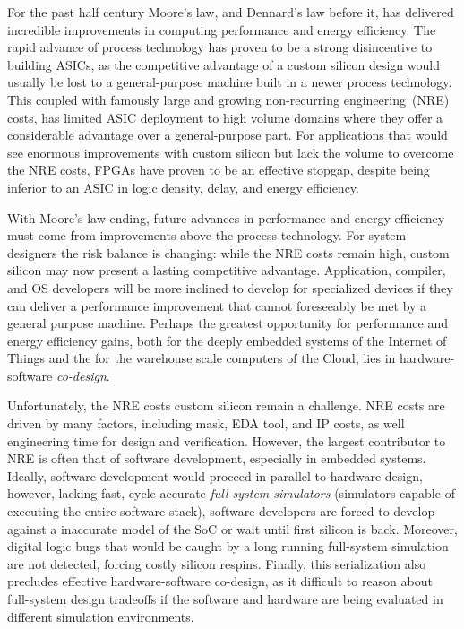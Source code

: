 For the past half century Moore's law, and Dennard's law before it, has
delivered incredible improvements in computing performance and energy
efficiency. The rapid advance of process technology has proven to be a strong
disincentive to building ASICs, as the competitive advantage of a custom
silicon design would usually be lost to a general-purpose machine built in a
newer process technology. This coupled with famously large and growing non-recurring
engineering~(NRE) costs, has limited ASIC deployment to high volume domains
where they offer a considerable advantage over a general-purpose part. For
applications that would see enormous improvements with custom silicon but lack
the volume to overcome the NRE costs, FPGAs have proven to be an effective
stopgap, despite being inferior to an ASIC in logic density, delay, and energy
efficiency.

With Moore’s law ending, future advances in performance and energy-efficiency
must come from improvements above the process technology. For system designers
the risk balance is changing: while the NRE costs remain high, custom silicon
may now present a lasting competitive advantage. Application, compiler, and OS
developers will be more inclined to develop for specialized devices
if they can deliver a performance improvement that cannot foreseeably be met by a
general purpose machine. Perhaps the greatest opportunity for performance and
energy efficiency gains, both for the deeply embedded systems of the Internet
of Things and the for the warehouse scale computers of the Cloud, lies in
hardware-software \emph{co-design}.

Unfortunately, the NRE costs custom silicon remain a challenge. NRE costs are
driven by many factors, including mask, EDA tool, and IP costs, as well
engineering time for design and verification. However, the largest contributor
to NRE is often that of software development, especially in embedded systems.
Ideally, software development would proceed in parallel to hardware design,
however, lacking fast, cycle-accurate \emph{full-system simulators} (simulators
capable of executing the entire software stack), software developers are forced
to develop against a inaccurate model of the SoC or wait until first silicon is
back. Moreover, digital logic bugs that would be caught by a long running
full-system simulation are not detected, forcing costly silicon respins.
Finally, this serialization also precludes effective hardware-software
co-design, as it difficult to reason about full-system design tradeoffs if the
software and hardware are being evaluated in different simulation environments.

